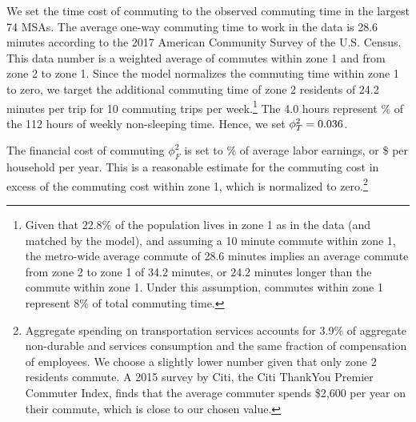 \documentclass[letterpaper,12pt,dvipsnames,usenames]{article}
\theoremstyle{definition}
\begin{document}
\begin{spacing}{1.25}
We set the time cost of commuting to the observed commuting time in the largest 74 MSAs. The average one-way commuting time to work in the data is 28.6 minutes according to the 2017 American Community Survey of the U.S. Census. This data number is a weighted average of commutes within zone 1 and from zone 2 to zone 1. Since the model normalizes the commuting time within zone 1 to zero, we target the additional commuting time of zone 2 residents of 24.2 minutes per trip for 10 commuting trips per week.\footnote{Given that 22.8\% of the population lives in zone 1 as in the data (and matched by the model), and assuming a 10 minute commute within zone 1, the metro-wide average commute of 28.6 minutes implies an average commute from zone 2 to zone 1 of 34.2 minutes, or 24.2 minutes longer than the commute within zone 1. Under this assumption, commutes within zone 1 represent 8\% of total commuting time.} The 4.0 hours represent {\CommCost}\% of the 112 hours of weekly non-sleeping time. Hence, we set $\phi_{T}^{2}={0.036}$.

The financial cost of commuting $\phi_{F}^{2}$ is set to {\CommCostFinbyInc}\% of average labor earnings, or  \${\CommCostFinDollar} per household per year. This is a reasonable estimate for the commuting cost in excess of the commuting cost within zone 1, which is normalized to zero.\footnote{Aggregate spending on transportation services accounts for 3.9\% of aggregate non-durable and services consumption and the same fraction of compensation of employees. We choose a slightly lower number given that only zone 2 residents commute. A 2015 survey by Citi, the Citi ThankYou Premier Commuter Index, finds that the average commuter spends \$2,600 per year on their commute, which is close to our chosen value.}





\end{spacing}
\end{document}
